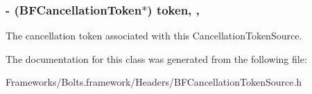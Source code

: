 \subsubsection[{token}]{\setlength{\rightskip}{0pt plus 5cm}-\/ ({\bf B\+F\+Cancellation\+Token}$\ast$) token\hspace{0.3cm}{\ttfamily [read]}, {\ttfamily [nonatomic]}, {\ttfamily [strong]}}\label{interface_b_f_cancellation_token_source_a17a7f0b94735efcab2dd4985060f4cb7}
The cancellation token associated with this Cancellation\+Token\+Source. 

The documentation for this class was generated from the following file\+:\begin{DoxyCompactItemize}
\item 
Frameworks/\+Bolts.\+framework/\+Headers/B\+F\+Cancellation\+Token\+Source.\+h\end{DoxyCompactItemize}
